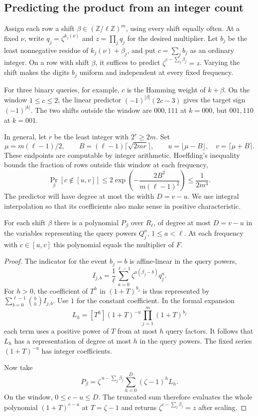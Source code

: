 \subsection{Predicting the product from an integer count}

Assign each row a shift \(\beta\in(\mathbb Z/\ell\mathbb Z)^m\), using
every shift equally often. At a fixed \(\nu\), write \(q_j=\zeta^{k_j(\nu)}\)
and \(z=\prod_jq_j\) for the desired multiplier. Let \(b_j\) be the least
nonnegative residue of \(k_j(\nu)+\beta_j\), and put \(c=\sum_j b_j\)
as an ordinary integer. On a row with shift \(\beta\), it suffices to
predict \(\zeta^{c-\sum_j\beta_j}=z\). Varying the shift makes the digits
\(b_j\) uniform and independent at every fixed frequency.

For three binary queries, for example, \(c\) is the Hamming weight of
\(k+\beta\). On the window \(1\le c\le2\), the linear predictor
\((-1)^{|\beta|}(2c-3)\) gives the target sign \((-1)^{|k|}\).
The two shifts outside the window are \(000,111\) at \(k=000\), but
\(001,110\) at \(k=001\).

In general, let \(r\) be the least integer with \(2^r\ge2m\). Set
\[
 \mu=m(\ell-1)/2,\qquad B=(\ell-1)\lceil\sqrt{2mr}\rceil,\qquad
 u=\lfloor\mu-B\rfloor,\quad v=\lceil\mu+B\rceil .
\]
These endpoints are computable by integer arithmetic. Hoeffding's
inequality \cite[Theorem~2]{hoeffding} bounds the fraction of rows
outside this window at each frequency,
\[
 \Pr_\beta[c\notin[u,v]]
    \le 2\exp\!\left(-\frac{2B^2}{m(\ell-1)^2}\right)
    \le \frac{1}{2m^3}.
\]
The predictor will have degree at most the width \(D=v-u\). We use
integral interpolation so that its coefficients also make sense in
positive characteristic.

\begin{lemma}\label{lem:count-predict}
For each shift \(\beta\) there is a polynomial \(P_\beta\) over
\(R_\ell\), of degree at most \(D=v-u\) in the variables representing
the query powers \(Q_j^a\), \(1\le a<\ell\). At each frequency with
\(c\in[u,v]\) this polynomial equals the multiplier of \(F\).
\end{lemma}
\begin{proof}
The indicator for the event \(b_j=b\) is affine-linear in the query powers,
\[
 I_{j,b}=\frac1\ell\sum_{a=0}^{\ell-1}\zeta^{a(\beta_j-b)}q_j^a.
\]
For \(h>0\), the coefficient of \(T^h\) in \((1+T)^{b_j}\) is thus
represented by \(\sum_{b=0}^{\ell-1}\binom bh I_{j,b}\). Use \(1\)
for the constant coefficient. In the formal expansion
\[
 L_h=[T^h](1+T)^{-u}\prod_{j=1}^m(1+T)^{b_j}
\]
each term uses a positive power of \(T\) from at most \(h\) query
factors. It follows that \(L_h\) has a representation of degree at
most \(h\) in the query powers. The fixed series \((1+T)^{-u}\) has
integer coefficients.

Now take
\[
 P_\beta=\zeta^{\,u-\sum_j\beta_j}
                \sum_{h=0}^{D}(\zeta-1)^h L_h .
\]
On the window, \(0\le c-u\le D\). The truncated sum therefore evaluates
the whole polynomial \((1+T)^{c-u}\) at \(T=\zeta-1\) and returns
\(\zeta^{c-\sum_j\beta_j}=z\) after scaling.
\end{proof}

